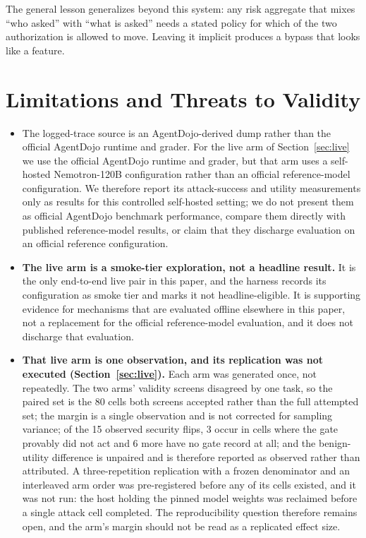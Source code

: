 \documentclass[letterpaper,twocolumn,10pt]{article}
\begin{document}
The general lesson generalizes beyond this system: any risk aggregate that
mixes ``who asked'' with ``what is asked'' needs a stated policy for which of
the two authorization is allowed to move. Leaving it implicit produces a bypass
that looks like a feature.

\section{Limitations and Threats to Validity}
\label{sec:limitations}

\begin{itemize}

\item The logged-trace source is an AgentDojo-derived dump rather than the
official AgentDojo runtime and grader. For the live arm of
Section~\ref{sec:live} we use the official AgentDojo runtime and grader, but
that arm uses a self-hosted Nemotron-120B configuration rather than an official
reference-model configuration. We therefore report its attack-success and
utility measurements only as results for this controlled self-hosted setting; we
do not present them as official AgentDojo benchmark performance, compare them
directly with published reference-model results, or claim that they discharge
evaluation on an official reference configuration.

\item \textbf{The live arm is a smoke-tier exploration, not a headline result.}
It is the only end-to-end live pair in this paper, and the harness records its
configuration as smoke tier and marks it not headline-eligible. It is supporting
evidence for mechanisms that are evaluated offline elsewhere in this paper, not
a replacement for the official reference-model evaluation, and it does not
discharge that evaluation.

\item \textbf{That live arm is one observation, and its replication was not
executed (Section~\ref{sec:live}).} Each arm was generated once, not repeatedly. The two arms' validity
screens disagreed by one task, so the paired set is the 80 cells both screens
accepted rather than the full attempted set; the margin is a single observation
and is not corrected for sampling variance; of the 15 observed security flips, 3
occur in cells where the gate provably did not act and 6 more have no gate record
at all; and the benign-utility difference is unpaired and is therefore reported
as observed rather than attributed. A three-repetition replication with a frozen
denominator and an interleaved arm order was pre-registered before any of its
cells existed, and it was not run: the host holding the pinned model weights was
reclaimed before a single attack cell completed. The reproducibility question
therefore remains open, and the arm's margin should not be read as a replicated
effect size.


\end{itemize}
\end{document}
